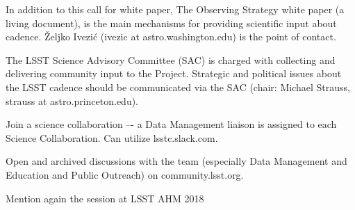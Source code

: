 \documentclass[DM,lsstdraft,toc,usenatbib]{lsstdoc}
\begin{document}
In addition to this call for white paper, The Observing Strategy white paper (a living document), 
is the main mechanisms for providing scientific input about cadence. 
\v{Z}eljko Ivezi\'{c} (ivezic at astro.washington.edu) is the point of contact.

The LSST Science Advisory Committee (SAC) is charged with collecting and delivering 
community input to the Project. Strategic and political issues about the LSST cadence should 
be communicated via the SAC (chair: Michael Strauss, strauss at astro.princeton.edu).

Join a science collaboration –- a Data Management liaison is assigned to each Science Collaboration.
Can utilize lsstc.slack.com.

Open and archived discussions with the team (especially Data Management and Education and 
Public Outreach) on community.lsst.org.

Mention again the session at LSST AHM 2018 
\end{document}
